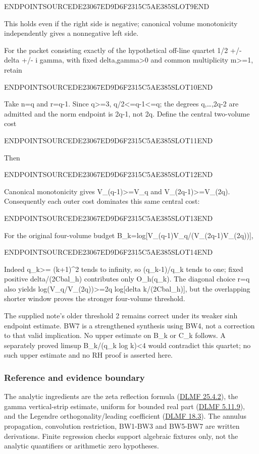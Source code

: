 ENDPOINTSOURCEDE23067ED9D6F2315C5AE385SLOT9END

This holds even if the right side is negative; canonical volume monotonicity independently gives a nonnegative left side.

For the packet consisting exactly of the hypothetical off-line quartet 1/2 +/- delta +/- i gamma, with fixed delta,gamma\textgreater0 and common multiplicity m\textgreater=1, retain

ENDPOINTSOURCEDE23067ED9D6F2315C5AE385SLOT10END

Take n=q and r=q-1. Since q\textgreater=3, q/2\textless=q-1\textless=q; the degrees q,\ldots,2q-2 are admitted and the norm endpoint is 2q-1, not 2q. Define the central two-volume cost

ENDPOINTSOURCEDE23067ED9D6F2315C5AE385SLOT11END

Then

ENDPOINTSOURCEDE23067ED9D6F2315C5AE385SLOT12END

Canonical monotonicity gives V\_(q-1)\textgreater=V\_q and V\_(2q-1)\textgreater=V\_(2q). Consequently each outer cost dominates this same central cost:

ENDPOINTSOURCEDE23067ED9D6F2315C5AE385SLOT13END

For the original four-volume budget B\_k=log{[}V\_(q-1)V\_q/(V\_(2q-1)V\_(2q)){]},

ENDPOINTSOURCEDE23067ED9D6F2315C5AE385SLOT14END

Indeed q\_k\textgreater= (k+1)\^{}2 tends to infinity, so (q\_k-1)/q\_k tends to one; fixed positive delta/(2Cbal\_h) contributes only O\_h(q\_k). The diagonal choice r=q also yields log(V\_q/V\_(2q))\textgreater=2q log{[}delta k/(2Cbal\_h){]}, but the overlapping shorter window proves the stronger four-volume threshold.

The supplied note's older threshold 2 remains correct under its weaker sinh endpoint estimate. BW7 is a strengthened synthesis using BW4, not a correction to that valid implication. No upper estimate on B\_k or C\_k follows. A separately proved limsup B\_k/(q\_k log k)\textless4 would contradict this quartet; no such upper estimate and no RH proof is asserted here.

\subsubsection{Reference and evidence boundary}\label{endpoint-balanced_window--reference-and-evidence-boundary}

The analytic ingredients are the zeta reflection formula (\href{https://dlmf.nist.gov/25.4.E2}{DLMF 25.4.2}), the gamma vertical-strip estimate, uniform for bounded real part (\href{https://dlmf.nist.gov/5.11.E9}{DLMF 5.11.9}), and the Legendre orthogonality/leading coefficient (\href{https://dlmf.nist.gov/18.3}{DLMF 18.3}). The annulus propagation, convolution restriction, BW1-BW3 and BW5-BW7 are written derivations. Finite regression checks support algebraic fixtures only, not the analytic quantifiers or arithmetic zero hypotheses.
